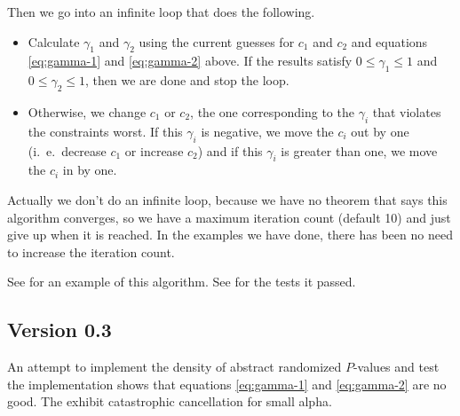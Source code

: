 \documentclass{article}
\begin{document}
Then we go into an infinite loop that does the following.
\begin{itemize}
\item Calculate $\gamma_1$ and $\gamma_2$ using the current guesses
for $c_1$ and $c_2$ and equations \eqref{eq:gamma-1} and \eqref{eq:gamma-2}
above.  If the results satisfy 
$0 \le \gamma_1 \le 1$ and $0 \le \gamma_2 \le 1$, then we are done
and stop the loop.
\item Otherwise, we change $c_1$ or $c_2$, the one corresponding to the
$\gamma_i$ that violates the constraints worst.  If this $\gamma_i$ is
negative, we move the $c_i$ out by one
(i.~e.\ decrease $c_1$ or increase $c_2$)
and if this $\gamma_i$ is greater than one, we move the $c_i$ in by one.
\end{itemize}
Actually we don't do an infinite loop, because we have no theorem that
says this algorithm converges, so we have a maximum iteration count
(default 10) and just give up when it is reached.  In the examples
we have done, there has been no need to increase the iteration count.

See  for an example of this algorithm.
See  for the tests it passed.

\subsection{Version 0.3}

An attempt to implement the density of abstract randomized $P$-values
and test the implementation shows that
equations \eqref{eq:gamma-1} and \eqref{eq:gamma-2} are no good.
The exhibit catastrophic cancellation for small alpha.
\end{document}
